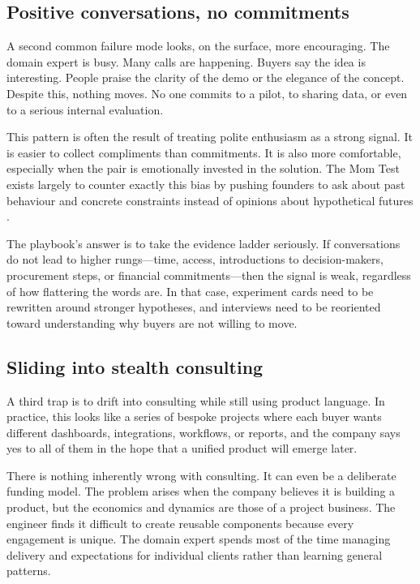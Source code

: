 \documentclass[10pt, a4paper, twocolumn]{article} %
\begin{document}
\subsection{Positive conversations, no commitments}

A second common failure mode looks, on the surface, more encouraging. The domain expert is busy. Many calls are happening. Buyers say the idea is interesting. People praise the clarity of the demo or the elegance of the concept. Despite this, nothing moves. No one commits to a pilot, to sharing data, or even to a serious internal evaluation.

This pattern is often the result of treating polite enthusiasm as a strong signal. It is easier to collect compliments than commitments. It is also more comfortable, especially when the pair is emotionally invested in the solution. The Mom Test exists largely to counter exactly this bias by pushing founders to ask about past behaviour and concrete constraints instead of opinions about hypothetical futures \citep{fitzpatrick2013mom}.

The playbook’s answer is to take the evidence ladder seriously. If conversations do not lead to higher rungs—time, access, introductions to decision-makers, procurement steps, or financial commitments—then the signal is weak, regardless of how flattering the words are. In that case, experiment cards need to be rewritten around stronger hypotheses, and interviews need to be reoriented toward understanding why buyers are not willing to move.

\subsection{Sliding into stealth consulting}

A third trap is to drift into consulting while still using product language. In practice, this looks like a series of bespoke projects where each buyer wants different dashboards, integrations, workflows, or reports, and the company says yes to all of them in the hope that a unified product will emerge later.

There is nothing inherently wrong with consulting. It can even be a deliberate funding model. The problem arises when the company believes it is building a product, but the economics and dynamics are those of a project business. The engineer finds it difficult to create reusable components because every engagement is unique. The domain expert spends most of the time managing delivery and expectations for individual clients rather than learning general patterns.
\end{document}
